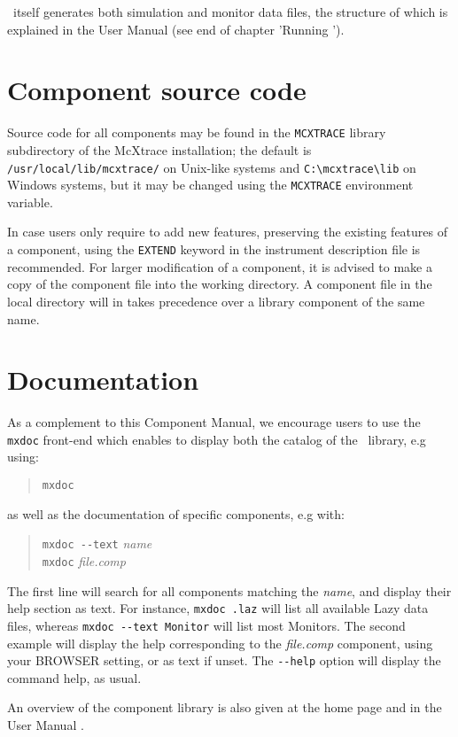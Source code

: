 \MCX\ itself generates both simulation and monitor data files, the structure of which is explained in the User Manual (see end of chapter 'Running \MCX').

\section{Component source code}
Source code for all components may be found in the \verb+MCXTRACE+ library
subdirectory of the McXtrace installation;
the default is \verb+/usr/local/lib/mcxtrace/+
on Unix-like systems and \verb+C:\mcxtrace\lib+ on Windows systems, but it may be
changed using the \verb+MCXTRACE+ environment variable.

In case users only require to add new features, preserving the existing features of a component, 
using the \verb+EXTEND+ keyword in the instrument description file is recommended. For larger modification of a component, it is advised to make a copy
of the component file into the working directory.
A component file in the local directory will in \MCX takes precedence over
a library component of the same name.

\section{Documentation}
As a complement to this Component Manual, we encourage users to use
the \verb+mxdoc+ front-end which enables to display both the
catalog of the \MCX\ library, e.g using: 
\begin{quote}
  \verb|mxdoc|
\end{quote}
as well as the documentation of specific components, e.g with:
\begin{quote}
  \verb|mxdoc --text| \textit{name} \\
  \verb|mxdoc| \textit{file.comp}
\end{quote}
The first line will search for all components matching the \textit{name},
and display their help section as text. For instance, \verb+mxdoc .laz+ will list all available Lazy data files, whereas \verb+mxdoc --text Monitor+ will list most Monitors.
The second example will display the help corresponding to
the \textit{file.comp} component, using your
BROWSER setting, or as text if unset.
The \verb+--help+ option will display the command help, as usual.

An overview of the component library is also given at the \MCX home page \cite{mcxtrace_webpage} and in the User Manual \cite{mcxtracemanual}.

